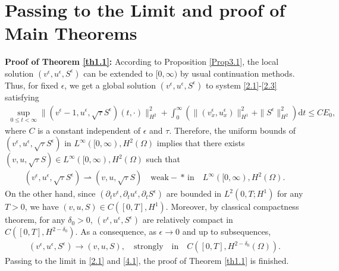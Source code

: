 \documentclass[10pt,reqno]{amsart}
\numberwithin{equation}{section}
\newcommand{\dif}{\mathrm{d}}
\begin{document}
\section{Passing to the Limit and  proof of Main Theorems}
{\bf Proof of Theorem \ref{th1.1}:} According to Proposition \ref{Prop3.1},  the local solution $(v^\epsilon, u^\epsilon, S^\epsilon)$ can be extended to $[0, \infty)$ by usual continuation methods. Thus, for fixed $\epsilon$, we get a global solution $(v^\epsilon, u^\epsilon, S^\epsilon)$ to system \eqref{2.1}-\eqref{2.3} satisfying 
\begin{align}\label{4.1}
\sup_{0\le t <\infty}\|(v^\epsilon-1, u^\epsilon, \sqrt{\tau}S^\epsilon)(t, \cdot)\|_{H^2}^2+ \int_0^\infty \left( \|(v^\epsilon_x, u^\epsilon_x)\|_{H^1}^2+ \|S^\epsilon\|_{H^2}^2 \right) \dif t 
\le C E_0,
\end{align}
where $C$ is a constant independent of $\epsilon$ and $\tau$.
Therefore, the uniform bounds of $(v^\epsilon, u^\epsilon, \sqrt{\tau} S^\epsilon)$ in $L^\infty([0, \infty), H^2(\Omega)$  implies  that there exists 
$(v, u, \sqrt{\tau} S)\in L^\infty([0, \infty), H^2(\Omega)$ such  that 
\begin{align*}
(v^\epsilon, u^\epsilon, \sqrt{\tau} S^\epsilon) \rightharpoonup (v, u, \sqrt{\tau} S)\quad \mathrm{weak-}\ast \, \mathrm{in}\quad L^\infty([0, \infty), H^2(\Omega).
\end{align*}
On the other hand, since $(\partial_tv^\epsilon, \partial_t u^\epsilon, \partial_t S^\epsilon)$ are bounded in $L^2(0, T; H^1)$ for any $T>0$, we have
$(v, u, S)\in C([0,T], H^1)$. Moreover, by classical compactness theorem, for any $\delta_0>0$, $(v^\epsilon, u^\epsilon, S^\epsilon)$ are relatively compact in $C([0, T], H^{2-\delta_0})$. As a consequence, as $\epsilon\rightarrow 0$ and up to subsequences, 
\begin{align*}
(v^\epsilon, u^\epsilon, S^\epsilon)\rightarrow (v, u, S), \quad \mathrm{strongly}\quad \mathrm{in}\quad C([0, T], H^{2-\delta_0}(\Omega)).
\end{align*}
Passing to the limit in \eqref{2.1} and \eqref{4.1}, the proof of Theorem \ref{th1.1} is finished.\\
\end{document}
